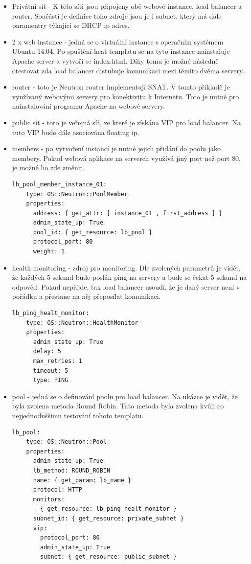 \begin{itemize}
\item Privátni síť - K této síti jsou připojeny obě webové instance, load balancer a router. Součástí je definice toho zdroje jsou je i subnet, který má dále paramentry týkající se DHCP ip adres.
\item 2 x web instance - jedná se o virtuální instance s operačním systémem Ubuntu 14.04. Po spuštění heat templatu se na tyto instance nainstaluje Apache server a vytvoří se index.html. Díky tomu je možné následně otestovat zda load balancer distubuje komunikaci mezi těmito dvěma servery.
\item router - toto je Neutron router implementují SNAT. V tomto příkladě je využívaný webovými servery pro konektivitu k Internetu. Toto je nutné pro nainstalování programu Apache na webové servery.
\item public síť - toto je veřejná síť, ze které je získána VIP pro load balancer. Na tuto VIP bude dále asociována floating ip. 
\item members - po vytvoření instancí je nutné jejich přidání do poolu jako membery. Pokud webová aplikace na serverch využívá jiný port než port 80, je možné ho zde změnit.

\begin{lstlisting}[caption=Healt monitor]
lb_pool_member_instance_01:
    type: OS::Neutron::PoolMember
    properties:
      address: { get_attr: [ instance_01 , first_address ] }
      admin_state_up: True
      pool_id: { get_resource: lb_pool }
      protocol_port: 80
      weight: 1
\end{lstlisting}

\item health monitoring - zdroj pro monitoring. Dle zvolených parametrů je vidět, že každých 5 sekund bude poslán ping na servery a bude se čekat 5 sekund na odpověď. Pokud nepříjde, tak load balancer usoudí, že je daný server není v pořádku a přestane na něj přeposílat komunikaci.

\begin{lstlisting}[caption=Healt monitor]
lb_ping_healt_monitor:
    type: OS::Neutron::HealthMonitor
    properties:
      admin_state_up: True
      delay: 5
      max_retries: 1
      timeout: 5
      type: PING
\end{lstlisting}

\item pool - jedná se o definování poolu pro load balancer. Na ukázce je vidět, že byla zvolena metoda Round Robin. Tato metoda byla zvolena kvůli co nejjednoduššímu testování tohoto templatu.

\begin{lstlisting}[caption=Healt monitor]
lb_pool:
    type: OS::Neutron::Pool
    properties:
      admin_state_up: True
      lb_method: ROUND_ROBIN
      name: { get_param: lb_name }
      protocol: HTTP
      monitors:
      - { get_resource: lb_ping_healt_monitor }
      subnet_id: { get_resource: private_subnet }
      vip:
        protocol_port: 80
        admin_state_up: True
        subnet: { get_resource: public_subnet }
\end{lstlisting}
\end{itemize}

